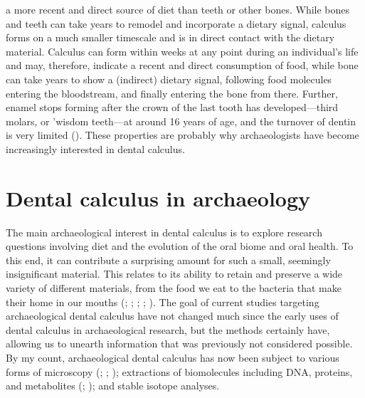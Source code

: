 \documentclass[
  b5paper,
]{book}
\begin{document}
a more recent and direct source of diet than teeth or other bones. While
bones and teeth can take years to remodel and incorporate a dietary
signal, calculus forms on a much smaller timescale and is in direct
contact with the dietary material. Calculus can form within weeks at any
point during an individual's life and may, therefore, indicate a recent
and direct consumption of food, while bone can take years to show a
(indirect) dietary signal, following food molecules entering the
bloodstream, and finally entering the bone from there. Further, enamel
stops forming after the crown of the last tooth has developed---third
molars, or 'wisdom teeth---at around 16 years of age, and the turnover
of dentin is very limited
(). These
properties are probably why archaeologists have become increasingly
interested in dental calculus.

\section{Dental calculus in archaeology}\label{intro-arch}

The main archaeological interest in dental calculus is to explore
research questions involving diet and the evolution of the oral biome
and oral health. To this end, it can contribute a surprising amount for
such a small, seemingly insignificant material. This relates to its
ability to retain and preserve a wide variety of different materials,
from the food we eat to the bacteria that make their home in our mouths
(;
;
;
; ). The goal of current studies targeting archaeological dental
calculus have not changed much since the early uses of dental calculus
in archaeological research, but the methods certainly have, allowing us
to unearth information that was previously not considered possible. By
my count, archaeological dental calculus has now been subject to various
forms of microscopy (; ; ); extractions of biomolecules including DNA,
proteins, and metabolites
(;
);
and stable isotope analyses.
\end{document}
